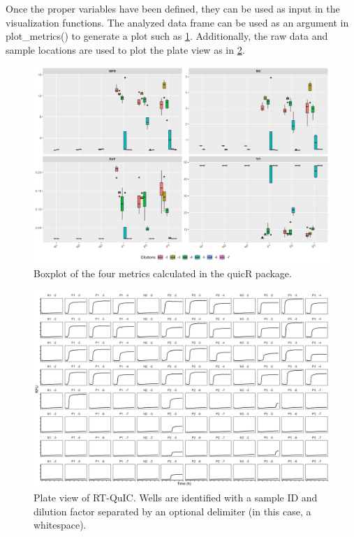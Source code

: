 \documentclass[preprint,12pt,a4paper]{elsarticle}
\begin{document}
            Once the proper variables have been defined, they can be used as input in the visualization functions. The analyzed data frame can be used as an argument in plot\_metrics() to generate a plot such as \ref{fig:boxplot}. Additionally, the raw data and sample locations are used to plot the plate view as in \ref{fig:plateview}.

            \begin{figure}[ht]
                \centering
                \includegraphics[width=\textwidth]{images/boxplot.png}
                \caption{Boxplot of the four metrics calculated in the quicR package.}
                \label{fig:boxplot}
            \end{figure}

            \begin{figure}[ht]
                \centering
                \includegraphics[width=\textwidth]{images/plate_view.png}
                \caption{Plate view of RT-QuIC. Wells are identified with a sample ID and dilution factor separated by an optional delimiter (in this case, a whitespace).}
                \label{fig:plateview}
            \end{figure}
            
\end{document}
